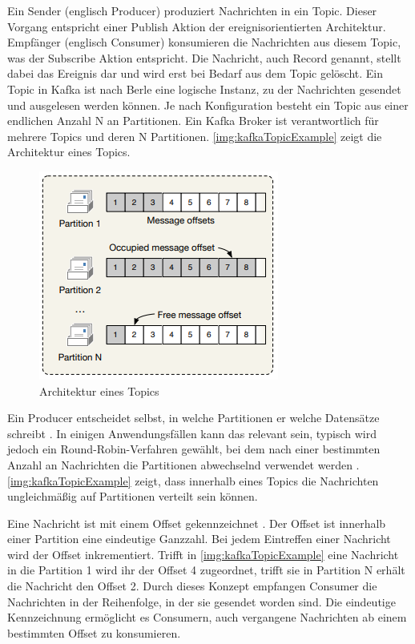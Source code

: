 \documentclass[a4paper,titlepage,halfparskip,12pt]{scrreprt}
\begin{document}
\begin{onehalfspacing}
Ein Sender (englisch Producer) produziert Nachrichten in ein Topic. Dieser Vorgang entspricht einer Publish Aktion der ereignisorientierten Architektur. Empfänger (englisch Consumer) konsumieren die Nachrichten aus diesem Topic, was der Subscribe Aktion entspricht. Die Nachricht, auch Record genannt, stellt dabei das Ereignis dar und wird erst bei Bedarf aus dem Topic gelöscht. Ein Topic in Kafka ist nach Berle \cite{berleKafkaOverview} eine logische Instanz, zu der Nachrichten gesendet und ausgelesen werden können. Je nach Konfiguration besteht ein Topic aus einer endlichen Anzahl N an Partitionen. Ein Kafka Broker ist verantwortlich für mehrere Topics und deren N Partitionen. \autoref{img:kafkaTopicExample} zeigt die Architektur eines Topics.

\begin{figure}[h]
	\centering
	\includegraphics[width=.55\textwidth]{images/kafkaTopicExample}
	\caption{Architektur eines Topics \cite{nannoniDissKafka}}
	\label{img:kafkaTopicExample}
\end{figure}

Ein Producer entscheidet selbst, in welche Partitionen er welche Datensätze schreibt \cite{berleKafkaOverview}. In einigen Anwendungsfällen kann das relevant sein, typisch wird jedoch ein Round-Robin-Verfahren gewählt, bei dem nach einer bestimmten Anzahl an Nachrichten die Partitionen abwechselnd verwendet werden \cite{berleKafkaOverview}. \autoref{img:kafkaTopicExample} zeigt, dass innerhalb eines Topics die Nachrichten ungleichmäßig auf Partitionen verteilt sein können.

Eine Nachricht ist mit einem Offset gekennzeichnet \cite{berleKafkaOverview, nannoniDissKafka}. Der Offset ist innerhalb einer Partition eine eindeutige Ganzzahl. Bei jedem Eintreffen einer Nachricht wird der Offset inkrementiert. Trifft in \autoref{img:kafkaTopicExample} eine Nachricht in die Partition 1 wird ihr der Offset 4 zugeordnet, trifft sie in Partition N erhält die Nachricht den Offset 2. Durch dieses Konzept empfangen Consumer die Nachrichten in der Reihenfolge, in der sie gesendet worden sind. Die eindeutige Kennzeichnung ermöglicht es Consumern, auch vergangene Nachrichten ab einem bestimmten Offset zu konsumieren.\cite{nannoniDissKafka}


\end{onehalfspacing}
\end{document}
